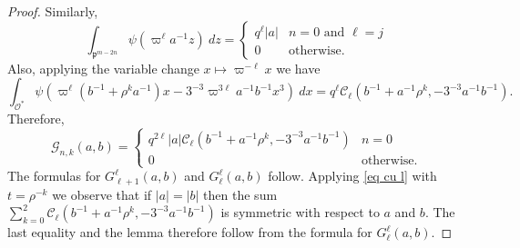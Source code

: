 \documentclass[12pt]{amsart}
\newcommand{\abs}[1]{\left|{#1}\right|}
\newcommand{\p}{\mathfrak{p}}
\renewcommand{\O}{\mathcal{O}}
\newcommand{\G}{\mathcal{G}}
\newcommand{\Cu}{\mathcal{C}}
\theoremstyle{remark}
\begin{document}
\begin{proof}
Similarly,
\[
\int_{\p^{m-2n}}\psi(\varpi^\ell a^{-1}z)\ dz=\begin{cases} q^\ell\abs{a}& n=0\text{ and }\ell=j \\ 0 & \text{otherwise.} \end{cases}
\]
Also, applying the variable change $x\mapsto \varpi^{-\ell}x$ we have
\[
\int_{\O^*}\psi(\varpi^\ell (b^{-1}+\rho^k a^{-1}) x-3^{-3}\varpi^{3\ell}a^{-1}b^{-1}x^3)\ dx=q^\ell\Cu_\ell(b^{-1}+a^{-1}\rho^k,-3^{-3}a^{-1}b^{-1}).
\]
Therefore, 
\[
\G_{n,k}(a,b)=\begin{cases} q^{2\ell}\abs{a}\Cu_\ell(b^{-1}+a^{-1}\rho^k,-3^{-3}a^{-1}b^{-1}) & n=0\\ 0 & \text{otherwise.}\end{cases}
\]
The formulas for $G_{\ell+1}^\ell(a,b)$ and $G_\ell^\ell(a,b)$ follow. Applying \eqref{eq cu l} with $t=\rho^{-k}$ we observe that if $\abs{a}=\abs{b}$ then the sum $\sum_{k=0}^2 \Cu_\ell(b^{-1}+a^{-1}\rho^k,-3^{-3}a^{-1}b^{-1})$ is symmetric with respect to $a$ and $b$. The last equality and the lemma therefore follow from the formula for $G_\ell^\ell(a,b)$.
\end{proof}
\end{document}

